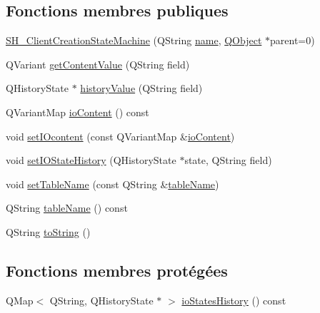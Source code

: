 \subsection*{Fonctions membres publiques}
\begin{DoxyCompactItemize}
\item 
\hyperlink{classSH__ClientCreationStateMachine_a0b406b0f404c0fd33bf35be8ce0cc811}{S\-H\-\_\-\-Client\-Creation\-State\-Machine} (Q\-String \hyperlink{classSH__NamedObject_a970f265df31b28b2179bbbceb6170ac2}{name}, \hyperlink{classQObject}{Q\-Object} $\ast$parent=0)
\item 
Q\-Variant \hyperlink{classSH__InOutStateMachine_a2cdd914f1e597ac52d021106eec75c89}{get\-Content\-Value} (Q\-String field)
\item 
Q\-History\-State $\ast$ \hyperlink{classSH__InOutStateMachine_a84fb2b2c2105cae9c590c0d15960854a}{history\-Value} (Q\-String field)
\item 
Q\-Variant\-Map \hyperlink{classSH__InOutStateMachine_a79b456cb2e353cb61ef9fe19c97fc8fb}{io\-Content} () const 
\item 
void \hyperlink{classSH__InOutStateMachine_a23a925522339132a51d16a7cff9074b9}{set\-I\-Ocontent} (const Q\-Variant\-Map \&\hyperlink{classSH__InOutStateMachine_a79b456cb2e353cb61ef9fe19c97fc8fb}{io\-Content})
\item 
void \hyperlink{classSH__InOutStateMachine_a4b72e6da839782a211692a4d728c3925}{set\-I\-O\-State\-History} (Q\-History\-State $\ast$state, Q\-String field)
\item 
void \hyperlink{classSH__InOutStateMachine_a437a730d07ddd15bd96314ab0b6cf40e}{set\-Table\-Name} (const Q\-String \&\hyperlink{classSH__InOutStateMachine_a18b07a985695100612bbcbda870933b4}{table\-Name})
\item 
Q\-String \hyperlink{classSH__InOutStateMachine_a18b07a985695100612bbcbda870933b4}{table\-Name} () const 
\item 
Q\-String \hyperlink{classSH__InOutStateMachine_a60ecd7de03d948e2d1e9cbedb5c3e5fa}{to\-String} ()
\end{DoxyCompactItemize}
\subsection*{Fonctions membres protégées}
\begin{DoxyCompactItemize}
\item 
Q\-Map$<$ Q\-String, Q\-History\-State $\ast$ $>$ \hyperlink{classSH__InOutStateMachine_a4ec3ebb4c40ea57c63afdf5976e62a94}{io\-States\-History} () const 
\end{DoxyCompactItemize}
